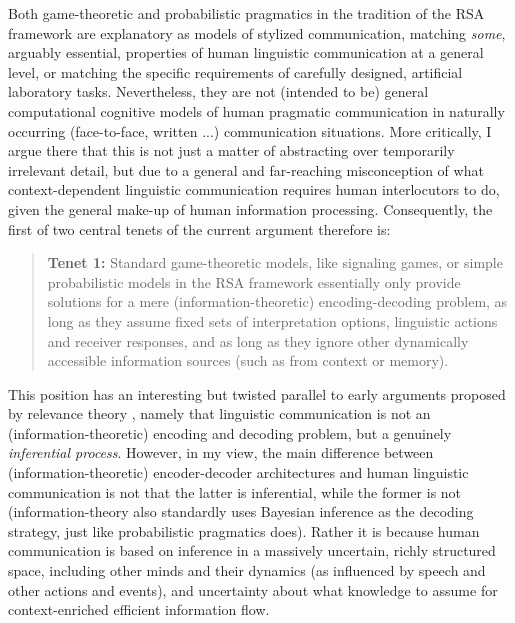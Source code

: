 \documentclass[fleqn,reqno,12pt]{article}
\begin{document}
Both game-theoretic and probabilistic pragmatics in the tradition of the RSA framework are explanatory as models of stylized communication, matching \emph{some}, arguably essential, properties of human linguistic communication at a general level, or matching the specific requirements of carefully designed, artificial laboratory tasks.
Nevertheless, they are not (intended to be) general computational cognitive models of human pragmatic communication in naturally occurring (face-to-face, written ...) communication situations.
More critically, I argue there that this is not just a matter of abstracting over temporarily irrelevant detail, but due to a general and far-reaching misconception of what context-dependent linguistic communication requires human interlocutors to do, given the general make-up of human information processing.
Consequently, the first of two central tenets of the current argument therefore is:
\begin{quote}
  \textbf{Tenet 1:}
  Standard game-theoretic models, like signaling games, or simple probabilistic models in the RSA framework essentially only provide solutions for a mere (information-theoretic) encoding-decoding problem, as long as they assume fixed sets of interpretation options, linguistic actions and receiver responses, and as long as they ignore other dynamically accessible information sources (such as from context or memory).
\end{quote}

This position has an interesting but twisted parallel to early arguments proposed by relevance theory \citep{SperberWilson1995:Relevance:-Comm,WilsonSperber2004:Relevance-Theor}, namely that linguistic communication is not an (information-theoretic) encoding and decoding problem, but a genuinely \emph{inferential process}.
However, in my view, the main difference between (information-theoretic) encoder-decoder architectures and human linguistic communication is not that the latter is inferential, while the former is not (information-theory also standardly uses Bayesian inference as the decoding strategy, just like probabilistic pragmatics does).
Rather it is because human communication is based on inference in a massively uncertain, richly structured space, including other minds and their dynamics (as influenced by speech and other actions and events), and uncertainty about what knowledge to assume for context-enriched efficient information flow.
\end{document}
